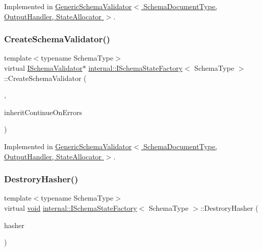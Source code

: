 Implemented in \hyperlink{classGenericSchemaValidator_abc377481583ca2095fb784be88887faa}{Generic\+Schema\+Validator$<$ Schema\+Document\+Type, Output\+Handler, State\+Allocator $>$}.

\mbox{\label{classinternal_1_1ISchemaStateFactory_aa9420905f406101f930bca3c9ca3a865}} 
\subsubsection{\texorpdfstring{Create\+Schema\+Validator()}{CreateSchemaValidator()}}
{\footnotesize\ttfamily template$<$typename Schema\+Type$>$ \\
virtual \hyperlink{classinternal_1_1ISchemaValidator}{I\+Schema\+Validator}$\ast$ \hyperlink{classinternal_1_1ISchemaStateFactory}{internal\+::\+I\+Schema\+State\+Factory}$<$ Schema\+Type $>$\+::Create\+Schema\+Validator (\begin{DoxyParamCaption}\item[{const Schema\+Type \&}]{,  }\item[{const bool}]{inherit\+Continue\+On\+Errors }\end{DoxyParamCaption})\hspace{0.3cm}{\ttfamily [pure virtual]}}



Implemented in \hyperlink{classGenericSchemaValidator_a48c724c1255cf1fcc53df75c791423a9}{Generic\+Schema\+Validator$<$ Schema\+Document\+Type, Output\+Handler, State\+Allocator $>$}.

\mbox{\label{classinternal_1_1ISchemaStateFactory_a70b8d88180d2e6993105b17f19101635}} 
\subsubsection{\texorpdfstring{Destrory\+Hasher()}{DestroryHasher()}}
{\footnotesize\ttfamily template$<$typename Schema\+Type$>$ \\
virtual \hyperlink{imgui__impl__opengl3__loader_8h_ac668e7cffd9e2e9cfee428b9b2f34fa7}{void} \hyperlink{classinternal_1_1ISchemaStateFactory}{internal\+::\+I\+Schema\+State\+Factory}$<$ Schema\+Type $>$\+::Destrory\+Hasher (\begin{DoxyParamCaption}\item[{\hyperlink{imgui__impl__opengl3__loader_8h_ac668e7cffd9e2e9cfee428b9b2f34fa7}{void} $\ast$}]{hasher }\end{DoxyParamCaption})\hspace{0.3cm}{\ttfamily [pure virtual]}}



